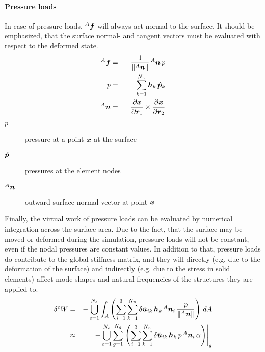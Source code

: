 \paragraph{Pressure loads}
In case of pressure loads, ${^A}\bm{f}$ will always act normal to the surface.
It should be emphasized, that the surface normal- and tangent vectors must be evaluated with respect to the deformed state.
\begin{eqnarray}
{^A}\bm{f} & = & -\frac{1}{\left\Vert{^A}\bm{n}\right\Vert} \, {^A}\bm{n} \, p \\
p & = & \sum_{k=1}^{N_n} \bm{h}_{k} \, \hat{\bm{p}}_k \\
{^A}\bm{n} & = & \frac{\partial \bm{x}}{\partial \bm{r}_1} \times \frac{\partial \bm{x}}{\partial \bm{r}_2}
\end{eqnarray}
\begin{description}
\item[$p$] pressure at a point $\bm{x}$ at the surface
\item[$\hat{\bm{p}}$] pressures at the element nodes
\item[${^A}\bm{n}$] outward surface normal vector at point $\bm{x}$
\end{description}
Finally, the virtual work of pressure loads can be evaluated by numerical integration across the surface area.
Due to the fact, that the surface may be moved or deformed during the simulation, pressure loads will not be constant,
even if the nodal pressures are constant values. In addition to that, pressure loads do contribute to the global stiffness matrix,
and they will directly (e.g. due to the deformation of the surface) and indirectly
(e.g. due to the stress in solid elements) affect mode shapes and natural frequencies of the structures they are applied to.
\begin{eqnarray}
\delta{^e}W & = & -\bigcup_{e=1}^{N_e}\int_{A} \left(\sum_{i=1}^3 \sum_{k=1}^{N_n} \delta\hat{\bm{u}}_{ik} \, \bm{h}_{k} \, {^A}\bm{n}_i \, \frac{p}{\left\Vert{^A}\bm{n}\right\Vert}\right) \, dA \\
 & \approx & -\bigcup_{e=1}^{N_e}\sum_{g=1}^{N_g} \left.\left(\sum_{i=1}^3 \sum_{k=1}^{N_n} \delta\hat{\bm{u}}_{ik} \, \bm{h}_{k} \, p \, {^A}\bm{n}_i \, \alpha \right)\right\vert_{g}
\end{eqnarray}
